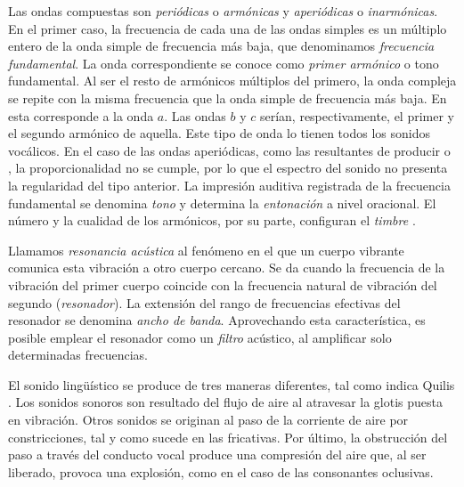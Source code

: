 Las ondas compuestas son \textit{periódicas} o \textit{armónicas} y \textit{aperiódicas} o \textit{inarmónicas}. En el primer caso, la frecuencia de cada una de las ondas simples es un múltiplo entero de la onda simple de frecuencia más baja, que denominamos \textit{frecuencia fundamental}. La onda correspondiente se conoce como \textit{primer armónico} o tono fundamental. Al ser el resto de armónicos múltiplos del primero, la onda compleja se repite con la misma frecuencia que la onda simple de frecuencia más baja.  En  esta corresponde a la onda $a$. Las ondas $b$ y $c$ serían, respectivamente, el primer y el segundo armónico de aquella. Este tipo de onda lo tienen todos los sonidos vocálicos. En el caso de las ondas aperiódicas, como las resultantes de producir \ipa{[f]} o \ipa{[s]}, la proporcionalidad no se cumple, por lo que el espectro del sonido no presenta la regularidad del tipo anterior. La impresión auditiva registrada de la frecuencia fundamental se denomina \textit{tono} y determina la \textit{entonación} a nivel oracional. El número y la cualidad de los armónicos, por su parte, configuran el \textit{timbre} \parencites[94]{quilis2019}[93]{clegg2018}. 

Llamamos \textit{resonancia acústica} al fenómeno en el que un cuerpo vibrante comunica esta vibración a otro cuerpo cercano. Se da cuando la frecuencia de la vibración del primer cuerpo coincide con la frecuencia natural de vibración del segundo  (\textit{resonador}). La extensión del rango de frecuencias efectivas del resonador se denomina \textit{ancho de banda}. Aprovechando esta característica, es posible emplear el resonador como un \textit{filtro} acústico, al amplificar solo determinadas frecuencias.

El sonido lingüístico se produce de tres maneras diferentes, tal como indica Quilis \parencite*{quilis2019}. Los sonidos sonoros son resultado del flujo de aire al atravesar la glotis puesta en vibración. Otros sonidos se originan al paso de la corriente de aire por constricciones, tal y como sucede en las fricativas. Por último, la obstrucción del paso a través del conducto vocal produce una compresión  del aire que, al ser liberado, provoca una explosión, como en el caso de las consonantes oclusivas.

